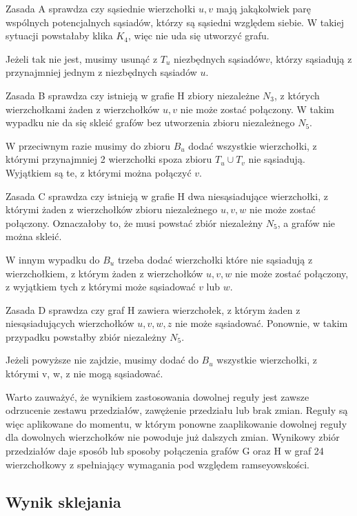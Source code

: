 \documentclass[11pt]{article}
\begin{document}
Zasada A sprawdza czy sąsiednie wierzchołki $u, v$ mają jakąkolwiek parę wspólnych potencjalnych sąsiadów, którzy są sąsiedni względem siebie.
W takiej sytuacji powstałaby klika $K_4$, więc nie uda się utworzyć grafu. \par

Jeżeli tak nie jest, musimy usunąć z $T_u$ niezbędnych sąsiadów$ v$, 
którzy sąsiadują z przynajmniej jednym z niezbędnych sąsiadów $u$. 

Zasada B sprawdza czy istnieją w grafie H zbiory niezależne $N_3$, z których wierzchołkami żaden z wierzchołków $u, v $ nie może zostać połączony. W takim wypadku nie da się skleić grafów bez utworzenia zbioru niezależnego $N_5$. 

W przeciwnym razie musimy do zbioru $B_u$ dodać wszystkie wierzchołki, 
z którymi przynajmniej 2 wierzchołki spoza zbioru $T_u \cup T_v$ nie sąsiadują. Wyjątkiem są te, z którymi można połączyć $v$. \par

Zasada C sprawdza czy istnieją w grafie H dwa niesąsiadujące wierzchołki, z którymi żaden z wierzchołków zbioru niezależnego $u, v, w$ nie może zostać połączony. 
Oznaczałoby to, że musi powstać zbiór niezależny $N_5$, a grafów nie można skleić.


W innym wypadku do $B_u$ trzeba dodać wierzchołki które nie sąsiadują z wierzchołkiem, 
z którym żaden z wierzchołków $u, v, w$ nie może zostać połączony, z wyjątkiem tych z którymi może sąsiadować $v$ lub $w$.  \par

Zasada D sprawdza czy graf H zawiera wierzchołek, z którym żaden z niesąsiadujących wierzchołków $u, v, w, z$
nie może sąsiadować. Ponownie, w takim przypadku powstałby zbiór niezależny $N_5$.

Jeżeli powyższe nie zajdzie, musimy dodać do $B_u$ wszystkie wierzchołki, z którymi v, w, z nie mogą sąsiadować. \par


Warto zauważyć, że wynikiem zastosowania dowolnej reguły jest zawsze odrzucenie zestawu przedziałów, zawężenie przedziału lub brak zmian. Reguły są więc aplikowane do momentu, w którym ponowne zaaplikowanie dowolnej reguły dla dowolnych wierzchołków nie powoduje już dalszych zmian. Wynikowy zbiór przedziałów daje sposób lub sposoby połączenia grafów G oraz H w graf 24 wierzchołkowy z spełniający wymagania pod względem ramseyowskości.

\subsection{Wynik sklejania}
\end{document}
